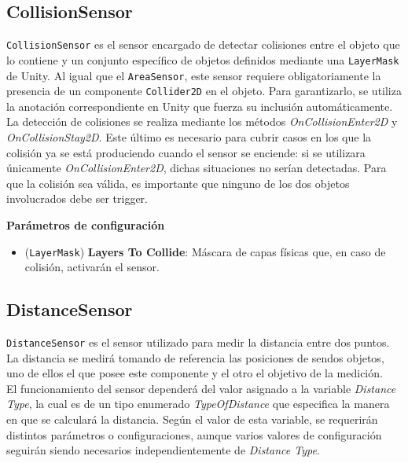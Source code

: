\subsection{CollisionSensor}
\texttt{CollisionSensor} es el sensor encargado de detectar colisiones entre el objeto que lo contiene y un conjunto específico de objetos definidos mediante una \texttt{LayerMask} de Unity. Al igual que el \texttt{AreaSensor}, este sensor requiere obligatoriamente la presencia de un componente \texttt{Collider2D} en el objeto. Para garantizarlo, se utiliza la anotación correspondiente en Unity que fuerza su inclusión automáticamente.\\

La detección de colisiones se realiza mediante los métodos \textit{OnCollisionEnter2D} y \textit{OnCollisionStay2D}. Este último es necesario para cubrir casos en los que la colisión ya se está produciendo cuando el sensor se enciende: si se utilizara únicamente \textit{OnCollisionEnter2D}, dichas situaciones no serían detectadas. Para que la colisión sea válida, es importante que ninguno de los dos objetos involucrados debe ser trigger.


\textbf{Parámetros de configuración}
\begin{itemize}
	\item (\texttt{LayerMask}) \textbf{Layers To Collide}: Máscara de capas físicas que, en caso de colisión, activarán el sensor.
\end{itemize}


\subsection{DistanceSensor}

\texttt{DistanceSensor} es el sensor utilizado para medir la distancia entre dos puntos. La distancia se medirá tomando de referencia las posiciones de sendos objetos, uno de ellos el que posee este componente y el otro el objetivo de la medición.\\

El funcionamiento del sensor dependerá del valor asignado a la variable \textit{Distance Type}, la cual es de un tipo enumerado \textit{TypeOfDistance} que especifica la manera en que se calculará la distancia. Según el valor de esta variable, se requerirán distintos parámetros o configuraciones, aunque varios valores de configuración seguirán siendo necesarios independientemente de \textit{Distance Type}.\\

